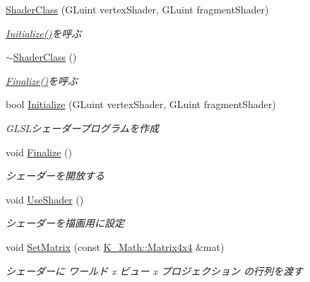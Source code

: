 \begin{DoxyCompactItemize}
\item 
\mbox{\hyperlink{class_k___graphics_1_1_shader_class_a3762d1f3d62a5b9fe6b37d36aeb8dd51}{Shader\+Class}} (G\+Luint vertex\+Shader, G\+Luint fragment\+Shader)
\begin{DoxyCompactList}\small\item\em \mbox{\hyperlink{class_k___graphics_1_1_shader_class_ac37343a738ce216a5f1f3fb501de79ed}{Initialize()}}を呼ぶ \end{DoxyCompactList}\item 
\mbox{\hyperlink{class_k___graphics_1_1_shader_class_ad007e6356bf230f441fd39a5127b76d7}{$\sim$\+Shader\+Class}} ()
\begin{DoxyCompactList}\small\item\em \mbox{\hyperlink{class_k___graphics_1_1_shader_class_aac58eae7621bb220380364400f659549}{Finalize()}}を呼ぶ \end{DoxyCompactList}\item 
bool \mbox{\hyperlink{class_k___graphics_1_1_shader_class_ac37343a738ce216a5f1f3fb501de79ed}{Initialize}} (G\+Luint vertex\+Shader, G\+Luint fragment\+Shader)
\begin{DoxyCompactList}\small\item\em G\+L\+S\+Lシェーダープログラムを作成 \end{DoxyCompactList}\item 
void \mbox{\hyperlink{class_k___graphics_1_1_shader_class_aac58eae7621bb220380364400f659549}{Finalize}} ()
\begin{DoxyCompactList}\small\item\em シェーダーを開放する \end{DoxyCompactList}\item 
void \mbox{\hyperlink{class_k___graphics_1_1_shader_class_a53590f2a34bbf3f1dc91398068f43754}{Use\+Shader}} ()
\begin{DoxyCompactList}\small\item\em シェーダーを描画用に設定 \end{DoxyCompactList}\item 
void \mbox{\hyperlink{class_k___graphics_1_1_shader_class_a8aa0f7eb6c2443df15d483653f9401e3}{Set\+Matrix}} (const \mbox{\hyperlink{namespace_k___math_a345271af9d32dff2c964bc679b13b45c}{K\+\_\+\+Math\+::\+Matrix4x4}} \&mat)
\begin{DoxyCompactList}\small\item\em シェーダーに ワールド x ビュー x プロジェクション の行列を渡す \end{DoxyCompactList}\item 

\end{DoxyCompactItemize}
